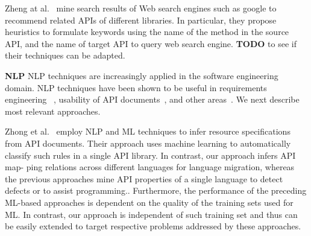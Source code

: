 Zheng at al.~\cite{Zheng2011FSE} mine search results of Web search engines such as google to recommend related APIs of different libraries. In particular, they propose heuristics to formulate keywords using the name of the method in the source API, and the name of target API to query web search engine. \textbf{TODO} to see if their techniques can be adapted.






\textbf{NLP}
NLP techniques are increasingly applied in the software engineering domain. NLP techniques have been shown to be useful in requirements engineering ~\cite{Sinha2009,Sinha2010,Gervasi2005}, usability of API documents~\cite{Dekel2009, pandita12:inferring}, and other areas~\cite{Zhou2008,Little2009, xiao11:improving, zhong09SE}. We next describe most relevant approaches.



Zhong et al.~\cite{zhong09SE} employ NLP and ML techniques to infer resource specifications from API documents. Their approach uses machine learning to automatically classify such rules in a single API library. In contrast, our approach infers API map-
ping relations across different languages for language migration, whereas the previous approaches mine API properties of a single language to detect defects or to assist programming.. Furthermore, the performance of the preceding ML-based approaches is dependent on the quality of the training sets used for ML. In contrast, our approach is independent of such training set and thus can be easily extended to target respective problems addressed by these approaches.

